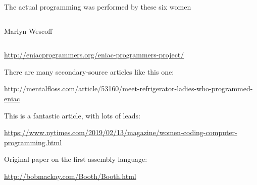 \documentclass[aspectratio=169]{beamer}
\begin{document}
\begin{frame}{The actual programming was performed by these six women}
\begin{columns}[t]
\begin{center}
Marlyn Wescoff
\end{center}
\end{columns}

\scriptsize
\vspace{0.4 cm}
\textcolor{blue}{\url{http://eniacprogrammers.org/eniac-programmers-project/}}

\vspace{0.2 cm}
There are many secondary-source articles like this one:

\vspace{0.2 cm}
\textcolor{blue}{\url{http://mentalfloss.com/article/53160/meet-refrigerator-ladies-who-programmed-eniac}}

\vspace{0.2 cm}
This is a fantastic article, with lots of leads:

\vspace{0.2 cm}
\textcolor{blue}{\url{https://www.nytimes.com/2019/02/13/magazine/women-coding-computer-programming.html}}

\vspace{0.2 cm}
Original paper on the first assembly language:

\vspace{0.2 cm}
\textcolor{blue}{\url{http://bobmackay.com/Booth/Booth.html}}
\end{frame}
\end{document}
